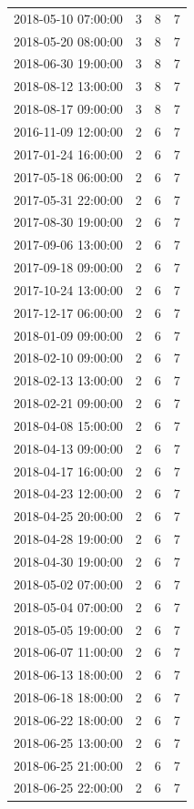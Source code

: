\begin{tabular}{lrrr}
2018-05-10 07:00:00 & 3 & 8 & 7 \\
2018-05-20 08:00:00 & 3 & 8 & 7 \\
2018-06-30 19:00:00 & 3 & 8 & 7 \\
2018-08-12 13:00:00 & 3 & 8 & 7 \\
2018-08-17 09:00:00 & 3 & 8 & 7 \\
2016-11-09 12:00:00 & 2 & 6 & 7 \\
2017-01-24 16:00:00 & 2 & 6 & 7 \\
2017-05-18 06:00:00 & 2 & 6 & 7 \\
2017-05-31 22:00:00 & 2 & 6 & 7 \\
2017-08-30 19:00:00 & 2 & 6 & 7 \\
2017-09-06 13:00:00 & 2 & 6 & 7 \\
2017-09-18 09:00:00 & 2 & 6 & 7 \\
2017-10-24 13:00:00 & 2 & 6 & 7 \\
2017-12-17 06:00:00 & 2 & 6 & 7 \\
2018-01-09 09:00:00 & 2 & 6 & 7 \\
2018-02-10 09:00:00 & 2 & 6 & 7 \\
2018-02-13 13:00:00 & 2 & 6 & 7 \\
2018-02-21 09:00:00 & 2 & 6 & 7 \\
2018-04-08 15:00:00 & 2 & 6 & 7 \\
2018-04-13 09:00:00 & 2 & 6 & 7 \\
2018-04-17 16:00:00 & 2 & 6 & 7 \\
2018-04-23 12:00:00 & 2 & 6 & 7 \\
2018-04-25 20:00:00 & 2 & 6 & 7 \\
2018-04-28 19:00:00 & 2 & 6 & 7 \\
2018-04-30 19:00:00 & 2 & 6 & 7 \\
2018-05-02 07:00:00 & 2 & 6 & 7 \\
2018-05-04 07:00:00 & 2 & 6 & 7 \\
2018-05-05 19:00:00 & 2 & 6 & 7 \\
2018-06-07 11:00:00 & 2 & 6 & 7 \\
2018-06-13 18:00:00 & 2 & 6 & 7 \\
2018-06-18 18:00:00 & 2 & 6 & 7 \\
2018-06-22 18:00:00 & 2 & 6 & 7 \\
2018-06-25 13:00:00 & 2 & 6 & 7 \\
2018-06-25 21:00:00 & 2 & 6 & 7 \\
2018-06-25 22:00:00 & 2 & 6 & 7 \\

\end{tabular}
